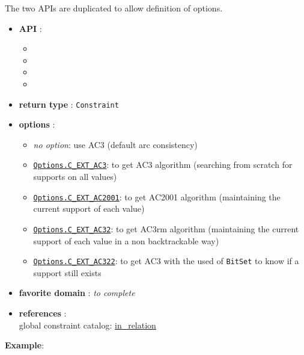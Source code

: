 The two APIs are duplicated to allow definition of options. 
\begin{itemize}
	\item \textbf{API} :
	\begin{itemize}
		\item {}
		\item {}
		\item {}
		\item {}
	\end{itemize}
	\item \textbf{return type} : \texttt{Constraint}
	\item \textbf{options} :
	\begin{itemize}
		\item \emph{no option}: use AC3 (default arc consistency)
		\item \hyperlink{cext3:cext3options}{\tt Options.C\_EXT\_AC3}: to get AC3 algorithm (searching from scratch for supports on all values)
		\item \hyperlink{cext2001:cext2001options}{\tt Options.C\_EXT\_AC2001}: to get AC2001 algorithm (maintaining the current support of each value)
		\item \hyperlink{cext32:cext32options}{\tt Options.C\_EXT\_AC32}: to get AC3rm algorithm (maintaining the current support of each value in a non backtrackable way)
		\item \hyperlink{cext322:cext322options}{\tt Options.C\_EXT\_AC322}: to get AC3 with the used of \texttt{BitSet} to know if a support still exists
	\end{itemize}
	\item \textbf{favorite domain} : \emph{to complete}
	\item \textbf{references} :\\
      global constraint catalog: \href{http://www.emn.fr/x-info/sdemasse/gccat/Cin_relation.html}{in\_relation}
\end{itemize}



\textbf{Example}:
 
